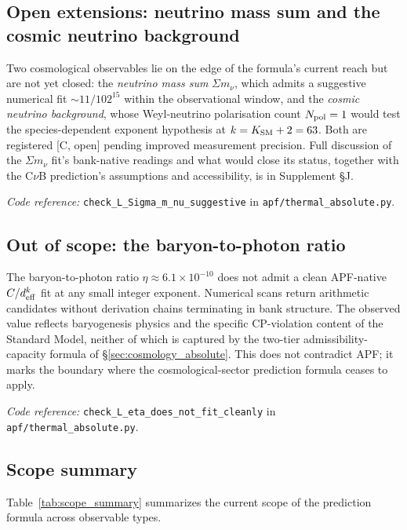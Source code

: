 \documentclass[11pt]{article}
\newcommand{\coderef}[2]{\smallskip\noindent\textit{Code reference:} \texttt{#1} in \texttt{#2}.}
\begin{document}
\subsection{Open extensions: neutrino mass sum and the cosmic neutrino background}\label{sec:robustness_open_extensions}

Two cosmological observables lie on the edge of the formula's current reach but are not yet closed: the \emph{neutrino mass sum} $\Sigma m_\nu$, which admits a suggestive numerical fit $\sim 11/102^{15}$ within the observational window, and the \emph{cosmic neutrino background}, whose Weyl-neutrino polarisation count $N_{\rm pol} = 1$ would test the species-dependent exponent hypothesis at $k = K_{\rm SM} + 2 = 63$.  Both are registered [C, open] pending improved measurement precision.  Full discussion of the $\Sigma m_\nu$ fit's bank-native readings and what would close its status, together with the C$\nu$B prediction's assumptions and accessibility, is in Supplement \S J.

\coderef{check\_L\_Sigma\_m\_nu\_suggestive}{apf/thermal\_absolute.py}

\subsection{Out of scope: the baryon-to-photon ratio}\label{sec:robustness_out_of_scope}

The baryon-to-photon ratio $\eta \approx 6.1 \times 10^{-10}$ does not admit a clean APF-native $C/d_{\rm eff}^k$ fit at any small integer exponent. Numerical scans return arithmetic candidates without derivation chains terminating in bank structure. The observed value reflects baryogenesis physics and the specific CP-violation content of the Standard Model, neither of which is captured by the two-tier admissibility-capacity formula of \S\ref{sec:cosmology_absolute}. This does not contradict APF; it marks the boundary where the cosmological-sector prediction formula ceases to apply.

\coderef{check\_L\_eta\_does\_not\_fit\_cleanly}{apf/thermal\_absolute.py}

\subsection{Scope summary}\label{sec:robustness_summary}

Table~\ref{tab:scope_summary} summarizes the current scope of the prediction formula across observable types.
\end{document}
